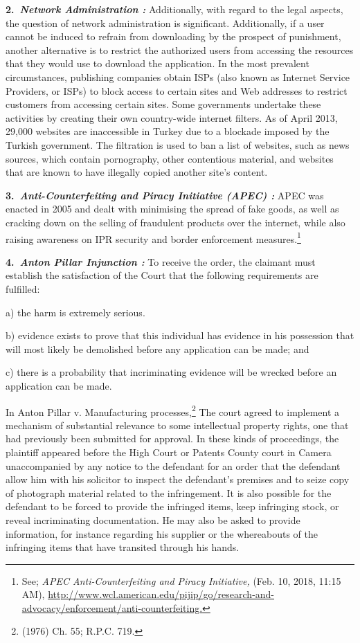 \begin{multicols}{2}
\noi
{\large \bfseries 2.~\textit{Network Administration :}} Additionally, with regard to the legal aspects, the question
of network administration is significant. Additionally, if a user cannot be induced to
refrain from downloading by the prospect of punishment, another alternative is to
restrict the authorized users from accessing the resources that they would use to
download the application. In the most prevalent circumstances, publishing companies
obtain ISPs (also known as Internet Service Providers, or ISPs) to block access to 
certain sites and Web addresses to restrict customers from accessing certain sites.
Some governments undertake these activities by creating their own country-wide
internet filters. As of April 2013, 29,000 websites are inaccessible in Turkey due to a
blockade imposed by the Turkish government. The filtration is used to ban a list of
websites, such as news sources, which contain pornography, other contentious
material, and websites that are known to have illegally copied another site's content.

\noi
{\large \bfseries 3.~\textit{Anti-Counterfeiting and Piracy Initiative (APEC) :}} APEC was enacted in 2005 and
dealt with minimising the spread of fake goods, as well as cracking down on the
selling of fraudulent products over the internet, while also raising awareness on IPR
security and border enforcement measures.\footnote{See; \textit{APEC Anti-Counterfeiting and Piracy Initiative,} (Feb. 10, 2018, 11:15 AM), \url{http://www.wcl.american.edu/pijip/go/research-and-advocacy/enforcement/anti-counterfeiting.}}

\noi
{\large \bfseries 4.~\textit{Anton Pillar Injunction :}} To receive the order, the claimant must establish the
satisfaction of the Court that the following requirements are fulfilled:

\noi
a) the harm is extremely serious.

\noi
b) evidence exists to prove that this individual has evidence in his possession that will
most likely be demolished before any application can be made; and

\noi
c) there is a probability that incriminating evidence will be wrecked before an
application can be made.

\noi
In Anton Pillar v. Manufacturing processes,\footnote{(1976) Ch. 55; R.P.C. 719.} The court agreed to implement a
mechanism of substantial relevance to some intellectual property rights, one that had
previously been submitted for approval. In these kinds of proceedings, the plaintiff
appeared before the High Court or Patents County court in Camera unaccompanied by
any notice to the defendant for an order that the defendant allow him with his solicitor
to inspect the defendant's premises and to seize copy of photograph material related to
the infringement. It is also possible for the defendant to be forced to provide the
infringed items, keep infringing stock, or reveal incriminating documentation. He may
also be asked to provide information, for instance regarding his supplier or the
whereabouts of the infringing items that have transited through his hands.


\end{multicols}
